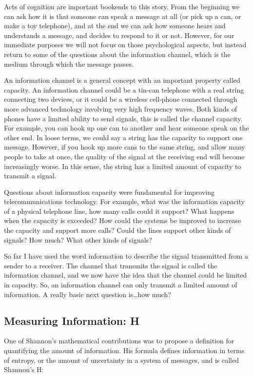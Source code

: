 \documentclass[
  oneside,
  12pt]{crumpbook}
\begin{document}
Acts of cognition are important bookends to this story. From the beginning we can ask how it is that someone can speak a message at all (or pick up a can, or make a toy telephone), and at the end we can ask how someone hears and understands a message, and decides to respond to it or not. However, for our immediate purposes we will not focus on those psychological aspects, but instead return to some of the questions about the information channel, which is the medium through which the message passes.

An information channel is a general concept with an important property called capacity. An information channel could be a tin-can telephone with a real string connecting two devices, or it could be a wireless cell-phone connected through more advanced technology involving very high frequency waves. Both kinds of phones have a limited ability to send signals, this is called the channel capacity. For example, you can hook up one can to another and hear someone speak on the other end. In loose terms, we could say a string has the capacity to support one message. However, if you hook up more cans to the same string, and allow many people to take at once, the quality of the signal at the receiving end will become increasingly worse. In this sense, the string has a limited amount of capacity to transmit a signal.

Questions about information capacity were fundamental for improving telecommunications technology. For example, what was the information capacity of a physical telephone line, how many calls could it support? What happens when the capacity is exceeded? How could the systems be improved to increase the capacity and support more calls? Could the lines support other kinds of signals? How much? What other kinds of signals?

So far I have used the word information to describe the signal transmitted from a sender to a receiver. The channel that transmits the signal is called the information channel, and we now have the idea that the channel could be limited in capacity. So, an information channel can only transmit a limited amount of information. A really basic next question is\ldots how much?

\hypertarget{measuring-information-h}{%
\subsection{Measuring Information: H}\label{measuring-information-h}}

One of Shannon's mathematical contributions was to propose a definition for quantifying the amount of information. His formula defines information in terms of entropy, or the amount of uncertainty in a system of messages, and is called Shannon's H:
\end{document}
